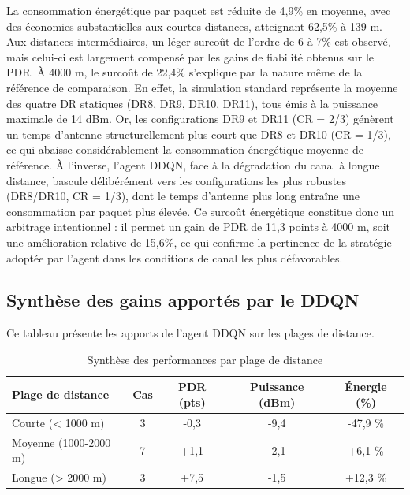 \begin{itemize}
	La consommation énergétique par paquet est réduite de 4,9\% en moyenne, avec des économies substantielles aux courtes distances, atteignant 62,5\% à 139 m. Aux distances intermédiaires, un léger surcoût de l'ordre de 6 à 7\% est observé, mais celui-ci est largement compensé par les gains de fiabilité obtenus sur le PDR.
	À 4000 m, le surcoût de 22,4\% s'explique par la nature même de la référence de comparaison. En effet, la simulation standard représente la moyenne des quatre DR statiques (DR8, DR9, DR10, DR11), tous émis à la puissance maximale de 14 dBm. Or, les configurations DR9 et DR11 (CR = 2/3) génèrent un temps d'antenne structurellement plus court que DR8 et DR10 (CR = 1/3), ce qui abaisse considérablement la consommation énergétique moyenne de référence. À l'inverse, l'agent DDQN, face à la dégradation du canal à longue distance, bascule délibérément vers les configurations les plus robustes (DR8/DR10, CR = 1/3), dont le temps d'antenne plus long entraîne une consommation par paquet plus élevée. Ce surcoût énergétique constitue donc un arbitrage intentionnel : il permet un gain de PDR de 11,3 points à 4000 m, soit une amélioration relative de 15,6\%, ce qui confirme la pertinence de la stratégie adoptée par l'agent dans les conditions de canal les plus défavorables.
	
\end{itemize}

\newpage
\subsection{Synthèse des gains apportés par le DDQN}

Ce tableau présente les apports de l'agent DDQN sur les plages de distance.

\begin{table}[H]
	\centering
	\caption{Synthèse des performances par plage de distance}
	\label{tab:synthese-plages}
	\begin{tabular}{|l|c|c|c|c|}
		\hline
		\textbf{Plage de distance} & \textbf{Cas} & \textbf{PDR (pts)} & \textbf{Puissance (dBm)} & \textbf{Énergie (\%)} \\
		\hline
		\hline
		Courte (< 1000 m)      & 3  & \cellcolor{red!30}-0,3 & \cellcolor{green!30}-9,4 & \cellcolor{green!30} -47,9 \% \\
		\hline
		Moyenne (1000-2000 m)  & 7  & \cellcolor{green!30} +1,1 & \cellcolor{green!30}-2,1 &\cellcolor{red!30} +6,1 \% \\
		\hline
		Longue (> 2000 m)      & 3  & \cellcolor{green!30}+7,5 & \cellcolor{green!30}-1,5 & \cellcolor{red!30}+12,3 \% \\
		\hline
	\end{tabular}
\end{table}

